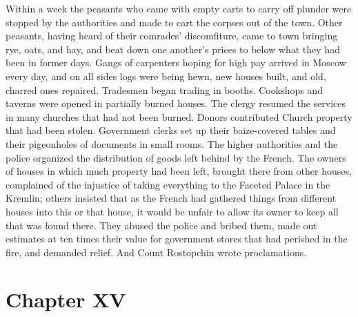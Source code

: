 Within a week the peasants who came with empty carts to carry off
plunder were stopped by the authorities and made to cart the
corpses out of the town. Other peasants, having heard of their
comrades' discomfiture, came to town bringing rye, oats, and hay,
and beat down one another's prices to below what they had been in
former days. Gangs of carpenters hoping for high pay arrived in
Moscow every day, and on all sides logs were being hewn, new
houses built, and old, charred ones repaired. Tradesmen began
trading in booths. Cookshops and taverns were opened in partially
burned houses. The clergy resumed the services in many churches
that had not been burned. Donors contributed Church property that
had been stolen. Government clerks set up their baize-covered
tables and their pigeonholes of documents in small rooms. The
higher authorities and the police organized the distribution of
goods left behind by the French. The owners of houses in which
much property had been left, brought there from other houses,
complained of the injustice of taking everything to the Faceted
Palace in the Kremlin; others insisted that as the French had
gathered things from different houses into this or that house, it
would be unfair to allow its owner to keep all that was found
there. They abused the police and bribed them, made out estimates
at ten times their value for government stores that had perished
in the fire, and demanded relief. And Count Rostopchin wrote
proclamations.


\chapter*{Chapter XV}
\ifaudio 
{}
\fi

